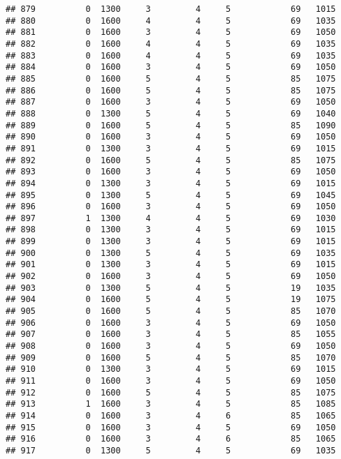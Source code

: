 \documentclass[]{article}
\begin{document}
\begin{verbatim}
## 879          0  1300     3         4     5            69   1015
## 880          0  1600     4         4     5            69   1035
## 881          0  1600     3         4     5            69   1050
## 882          0  1600     4         4     5            69   1035
## 883          0  1600     4         4     5            69   1035
## 884          0  1600     3         4     5            69   1050
## 885          0  1600     5         4     5            85   1075
## 886          0  1600     5         4     5            85   1075
## 887          0  1600     3         4     5            69   1050
## 888          0  1300     5         4     5            69   1040
## 889          0  1600     5         4     5            85   1090
## 890          0  1600     3         4     5            69   1050
## 891          0  1300     3         4     5            69   1015
## 892          0  1600     5         4     5            85   1075
## 893          0  1600     3         4     5            69   1050
## 894          0  1300     3         4     5            69   1015
## 895          0  1300     5         4     5            69   1045
## 896          0  1600     3         4     5            69   1050
## 897          1  1300     4         4     5            69   1030
## 898          0  1300     3         4     5            69   1015
## 899          0  1300     3         4     5            69   1015
## 900          0  1300     5         4     5            69   1035
## 901          0  1300     3         4     5            69   1015
## 902          0  1600     3         4     5            69   1050
## 903          0  1300     5         4     5            19   1035
## 904          0  1600     5         4     5            19   1075
## 905          0  1600     5         4     5            85   1070
## 906          0  1600     3         4     5            69   1050
## 907          0  1600     3         4     5            85   1055
## 908          0  1600     3         4     5            69   1050
## 909          0  1600     5         4     5            85   1070
## 910          0  1300     3         4     5            69   1015
## 911          0  1600     3         4     5            69   1050
## 912          0  1600     5         4     5            85   1075
## 913          1  1600     3         4     5            85   1085
## 914          0  1600     3         4     6            85   1065
## 915          0  1600     3         4     5            69   1050
## 916          0  1600     3         4     6            85   1065
## 917          0  1300     5         4     5            69   1035

\end{verbatim}
\end{document}
